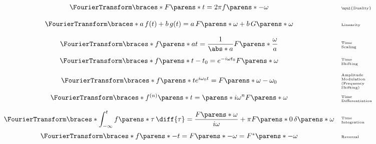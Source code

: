 \begin{multicols}{2}
\begin{CheatsheetEntryFrame}
        \begin{equation*}
            \begin{array}{cl}
                \FourierTransform\braces*{F\parens*{t}}
                = 2 \pi f \parens*{-\omega}
                & \text{\tiny\myul{Duality}}
                \\[1.2em]
                \FourierTransform\braces*{a \, f(t) + b \, g(t)}
                = a \, F\parens*{\omega} + b \, G\parens*{\omega}
                & \text{\tiny Linearity}
                \\[1.2em]
                {\displaystyle
                    \FourierTransform\braces*{f\parens*{a t}}
                    = \frac{1}{\abs*{a}} F\parens*{\frac{\omega}{a}}
                }
                & \text{\tiny\parbox{6em}{Time\\Scaling}}
                \\[1.2em]
                \FourierTransform\braces*{f\parens*{t - t_0}}
                = e^{-i \omega t_0} F\parens*{\omega}
                & \text{\tiny\parbox{6em}{Time\\Shifting}}
                \\[1.2em]
                \FourierTransform\braces*{f\parens*{t} e^{i \omega_0 t}}
                = F\parens*{\omega - \omega_0}
                & \text{\tiny\parbox{6em}{Amplitude\\Modulation\\(Frequency\\Shifting)}}
                \\[1.2em]
                \FourierTransform\braces*{f^{(n)}\parens*{t}}
                = \parens*{i \omega}^n F\parens*{\omega}
                & \text{\tiny\parbox{6em}{Time\\Differentiation}}
                \\[1.2em]
                {\displaystyle
                    \FourierTransform\braces*{
                        \int_{-\infty}^t f\parens*{\tau} \,\diff{\tau}
                    }
                    = \frac{F\parens*{\omega}}{i \omega}
                    + \pi F\parens*{0} \, \delta\parens*{\omega}
                }
                & \text{\tiny\parbox{6em}{Time\\Integration}}
                \\[1.2em]
                \FourierTransform\braces*{f\parens*{-t}}
                = F\parens*{-\omega}
                = F^*\parens*{-\omega}
                & \text{\tiny Reversal}

\end{array}
\end{equation*}
\end{CheatsheetEntryFrame}
\end{multicols}
